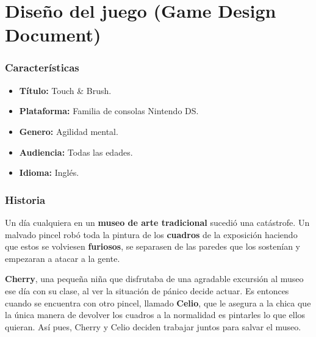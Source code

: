 
\chapter{Diseño del juego (Game Design Document)} 

\subsection{Características}

\begin{itemize}
    \item \textbf{Título:} Touch \& Brush.
    \item \textbf{Plataforma:} Familia de consolas Nintendo DS.
    \item \textbf{Genero:} Agilidad mental.
    \item \textbf{Audiencia:} Todas las edades.
    \item \textbf{Idioma:} Inglés.
\end{itemize}

\vspace{1cm}


\subsection{Historia}

Un día cualquiera en un \textbf{museo de arte tradicional} sucedió una catástrofe. Un malvado pincel robó toda la pintura de los \textbf{cuadros} de la exposición haciendo que estos se volviesen \textbf{furiosos}, se separasen de las paredes que los sostenían y empezaran a atacar a la gente.

\vspace{0.5cm}


\textbf{Cherry}, una pequeña niña que disfrutaba de una agradable excursión al museo ese día con su clase, al ver la situación de pánico decide actuar. Es entonces cuando se encuentra con otro pincel, llamado \textbf{Celio}, que le asegura a la chica que la única manera de devolver los cuadros a la normalidad es pintarles lo que ellos quieran. Así pues, Cherry y Celio deciden trabajar juntos para salvar el museo.

